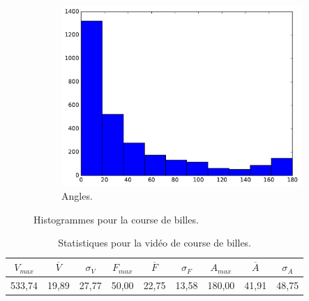 \begin{appendices}
\begin{figure}[htbp]
\begin{subfigure}[t]{\subImgWclicks}
			\includegraphics[width=\textwidth]{figures/ch3/bille_angle}
			\caption{Angles.}
			\label{fig:bille_angle}
		\end{subfigure}
		\caption[Histogrammes pour la course de billes]{Histogrammes pour la course de billes.}
		\label{fig:histBille}
	\end{figure}

\begin{table}
	\centering
	\begin{tabular}{c c c c c c c c c}
		$V_{max}$	& $\overline{V}$	& $\sigma_{V}$	& $F_{max}$	& $\overline{F}$	& $\sigma_{F}$	& $A_{max}$	& $\overline{A}$	& $\sigma_{A}$	\bigstrut[b] \\ \hline

		533,74		& 19,89				& 27,77			& 50,00		& 22,75				& 13,58			& 180,00	& 41,91				& 48,75			\bigstrut[t] \\
	\end{tabular}
	\caption[Statistiques pour la vidéo de course de billes]{Statistiques pour la vidéo de course de billes.}
	\label{tab:bille_stats}
\end{table}





\end{appendices}
